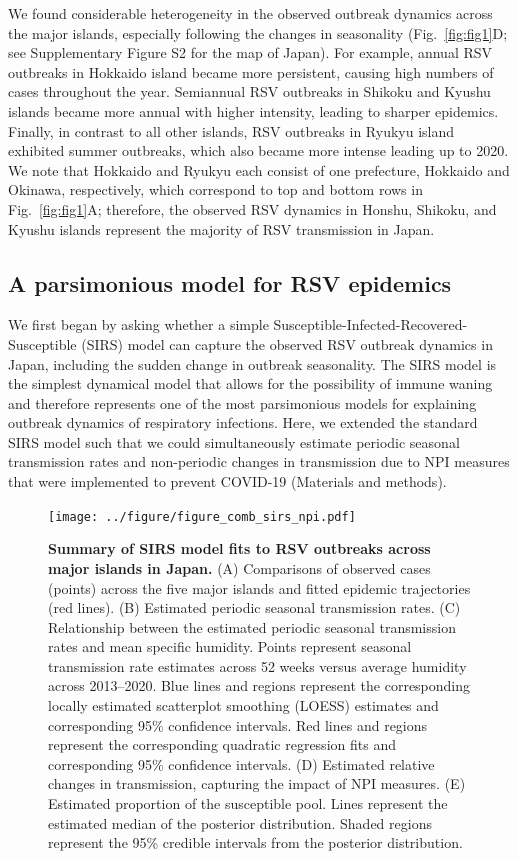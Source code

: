 \documentclass[12pt]{article}
\newcommand{\fref}[1]{Fig.~\ref{fig:#1}}
\begin{document}
We found considerable heterogeneity in the observed outbreak dynamics across the major islands, especially following the changes in seasonality (\fref{fig1}D; see Supplementary Figure S2 for the map of Japan).
For example, annual RSV outbreaks in Hokkaido island became more persistent, causing high numbers of cases throughout the year.
Semiannual RSV outbreaks in Shikoku and Kyushu islands became more annual with higher intensity, leading to sharper epidemics.
Finally, in contrast to all other islands, RSV outbreaks in Ryukyu island exhibited summer outbreaks, which also became more intense leading up to 2020.
We note that Hokkaido and Ryukyu each consist of one prefecture, Hokkaido and Okinawa, respectively, 
which correspond to top and bottom rows in \fref{fig1}A;
therefore, the observed RSV dynamics in Honshu, Shikoku, and Kyushu islands represent the majority of RSV transmission in Japan.

\subsection*{A parsimonious model for RSV epidemics}

We first began by asking whether a simple Susceptible-Infected-Recovered-Susceptible (SIRS) model can capture the observed RSV outbreak dynamics in Japan, including the sudden change in outbreak seasonality.
The SIRS model is the simplest dynamical model that allows for the possibility of immune waning and therefore represents one of the most parsimonious models for explaining outbreak dynamics of respiratory infections.
Here, we extended the standard SIRS model such that we could simultaneously estimate periodic seasonal transmission rates and non-periodic changes in transmission due to NPI measures that were implemented to prevent COVID-19 (Materials and methods).

\begin{figure}[!th]
\texttt{[image: ../figure/figure\_comb\_sirs\_npi.pdf]}
\caption{
\textbf{Summary of SIRS model fits to RSV outbreaks across major islands in Japan.}
(A) Comparisons of observed cases (points) across the five major islands and fitted epidemic trajectories (red lines).
(B) Estimated periodic seasonal transmission rates.
(C) Relationship between the estimated periodic seasonal transmission rates and mean specific humidity.
Points represent seasonal transmission rate estimates across 52 weeks versus average humidity across 2013--2020.
Blue lines and regions represent the corresponding locally estimated scatterplot smoothing (LOESS) estimates and corresponding 95\%  confidence intervals.
Red lines and regions represent the corresponding quadratic regression fits and corresponding 95\% confidence intervals.
(D) Estimated relative changes in transmission, capturing the impact of NPI measures.
(E) Estimated proportion of the susceptible pool.
Lines represent the estimated median of the posterior distribution.
Shaded regions represent the 95\% credible intervals from the posterior distribution.
}
\label{fig:fig2}
\end{figure}
\end{document}
